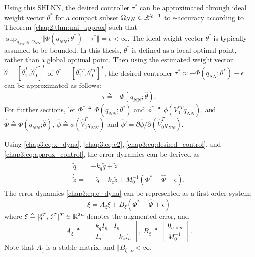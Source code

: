 Using this SHLNN, the desired controller $\tau^*$ can be approximated through ideal weight vector $\theta^*$ for a compact subset $\Omega_{NN}\in\mathbb{R}^{l_0+1}$ to $\epsilon$-accuracy according to Theorem \ref{chap2:thm:uni_approx} such that $\sup_{{q_{NN}}\in\Omega_{NN}} \Vert\Phi({q_{NN}};\theta^*) - \tau^*\Vert=\epsilon<\infty$.
The ideal weight vector $\theta^*$ is typically assumed to be bounded.
In this thesis, $\theta^*$ is defined as a local optimal point, rather than a global optimal point.
Then using the estimated weight vector $\hat\theta=[\hat\theta_1^T,\hat\theta_0^T]^T$ of $\theta^*=[\theta_1^{*T},\theta_0^{*T}]^T$, the desired controller $\tau^*\approx -\Phi(q_{NN};\theta^*)-\epsilon$ can be approximated as follows:
\begin{equation}
    \tau \triangleq -\Phi({q_{NN}};\hat\theta)
    .
    \label{chap3:eq:approx_control}
\end{equation}
For further sections, let $\Phi^*\triangleq\Phi({q_{NN}};\theta^*)$ and $\phi^* \triangleq\phi(V_0^{*T}{q_{NN}})$, and $\hat\Phi\triangleq\Phi({q_{NN}};\hat\theta)$, $\hat\phi \triangleq\phi(\hat V_0^{T}{q_{NN}})$ and $\hat\phi' = \partial \hat\phi/\partial (\hat V_0^Tq_{NN})$.

Using \eqref{chap3:eq:x_dyna}, \eqref{chap3:eq:e2}, \eqref{chap3:eq:desired_control}, and \eqref{chap3:eq:approx_control}, the error dynamics can be derived as
\begin{equation}
    \begin{aligned}
        \dot {\tilde q} = & -{k_q} {\tilde q} + {\tilde z} \\
        \dot {\tilde z} = & -{\tilde q} -{k_z} {\tilde z} + M_0^{-1} (\Phi^*-\hat\Phi+\epsilon).
    \end{aligned}
    \label{chap3:eq:e_dyna}
\end{equation}
The error dynamics \eqref{chap3:eq:e_dyna} can be represented as a first-order system: 
\begin{equation}
    \dot\xi = A_\xi \xi + B_\xi (\Phi^*-\hat\Phi+\epsilon)
    \label{chap3:eq:xi_dyna}
\end{equation}
where $\xi\triangleq[{\tilde q}^T  , {\tilde z}^T  ]^T  \in\mathbb{R}^{2n}$ denotes the augmented error, and
\begin{equation}
    A_\xi \triangleq 
    \begin{bmatrix}
        -{k_q} I_n &I_n\\-I_n& -{k_z} I_n
    \end{bmatrix}
    ,\ 
    B_\xi \triangleq 
    \begin{bmatrix}
        0_{n\times n}\\M_0^{-1}
    \end{bmatrix}
    .
\end{equation}
Note that $A_\xi$ is a stable matrix, and $\Vert B_\xi\Vert_F<\infty$.

